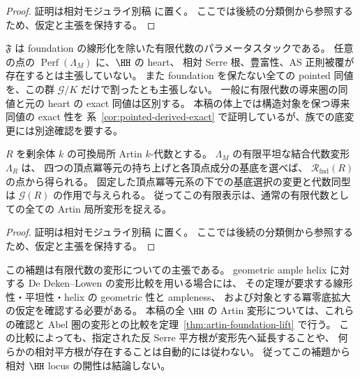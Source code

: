 \begin{proof}
証明は相対モジュライ別稿 \cite[\texttt{foundation_stack} 節]{QuadricModuli2026} に置く。
ここでは後続の分類側から参照するため、仮定と主張を保持する。
\end{proof}

\begin{remark}
$\mathfrak F$ は foundation の線形化を除いた有限代数のパラメータスタックである。
任意の点の $\operatorname{Perf}(\Lambda_M)$ に、$\HH$ の heart、
相対 Serre 根、豊富性、AS 正則被覆が存在するとは主張していない。
また foundation を保たない全ての pointed 同値を、この群 $\mathcal G/K$ だけで割ったとも主張しない。
一般に有限代数の導来圏の同値と元の heart の exact 同値は区別する。
本稿の体上では構造対象を保つ導来同値の exact 性を
系~\ref{cor:pointed-derived-exact} で証明しているが、族での底変更には別途確認を要する。
\end{remark}

\begin{lemma}
\label{lem:foundation-artin-deformation}
$R$ を剰余体 $k$ の可換局所 Artin $k$-代数とする。
$\Lambda_M$ の有限平坦な結合代数変形 $\Lambda_R$ は、
四つの頂点冪等元の持ち上げと各頂点成分の基底を選べば、
$\mathcal R_{\mathrm{fnd}}(R)$ の点から得られる。
固定した頂点冪等元系の下での基底選択の変更と代数同型は
$\mathcal G(R)$ の作用で与えられる。
従ってこの有限表示は、通常の有限代数としての全ての Artin 局所変形を捉える。
\end{lemma}
\begin{proof}
証明は相対モジュライ別稿 \cite[\texttt{foundation_stack} 節]{QuadricModuli2026} に置く。
ここでは後続の分類側から参照するため、仮定と主張を保持する。
\end{proof}

\begin{remark}
この補題は有限代数の変形についての主張である。
geometric ample helix に対する De Deken--Lowen
\cite[\S4.1, Theorems 4.5 and 5.15]{DeDekenLowen2011} の変形比較を用いる場合には、
その定理が要求する線形性・平坦性・helix の geometric 性と ampleness、
および対象とする冪零底拡大の仮定を確認する必要がある。
本稿の全 $\HH$ の Artin 変形については、これらの確認と
Abel 圏の変形との比較を定理~\ref{thm:artin-foundation-lift} で行う。
この比較によっても、指定された反 Serre 平方根が変形先へ延長することや、
何らかの相対平方根が存在することは自動的には従わない。
従ってこの補題から相対 $\HH$ locus の開性は結論しない。
\end{remark}

